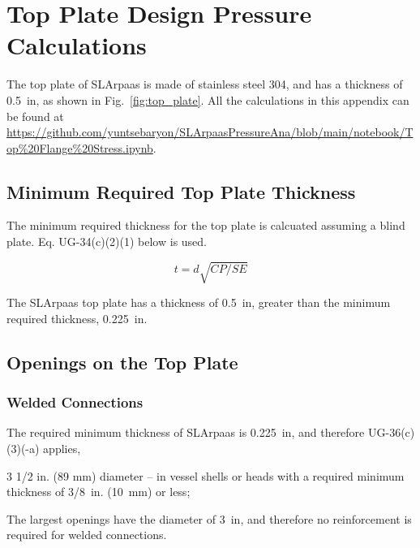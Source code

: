 \section{Top Plate Design Pressure Calculations}
\label{app:top_plate}

The top plate of SLArpaas is made of stainless steel 304, and has
a thickness of 0.5~in, as shown in Fig.~\ref{fig:top_plate}.
All the calculations in this appendix can be found
at \url{https://github.com/yuntsebaryon/SLArpaasPressureAna/blob/main/notebook/Top%20Flange%20Stress.ipynb}.

\subsection{Minimum Required Top Plate Thickness}
\label{app:blind_flange}

The minimum required thickness for the top plate is calcuated assuming
a blind plate.  Eq. UG-34(c)(2)(1) below is used.

\begin{equation}
    t= d\sqrt{CP/SE}
\end{equation}



The SLArpaas top plate has a thickness of 0.5~in, greater than the minimum
required thickness, 0.225~in.

\subsection{Openings on the Top Plate}
\label{app:openings}

\subsubsection{Welded Connections}
\label{app:welded}

The required minimum thickness of SLArpaas is 0.225~in, and therefore
UG-36(c)(3)(-a) applies,

\begin{displayquote}
    3 1/2 in. (89 mm) diameter -- in vessel shells or heads with a 
    required minimum thickness of 3/8~in. (10~mm) or less;
\end{displayquote}

The largest openings have the diameter of 3~in, 
and therefore no reinforcement is required for welded connections.

